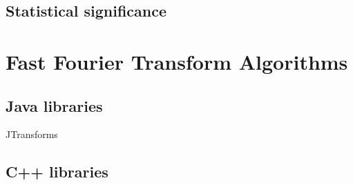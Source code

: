 \subsection{Statistical significance}

\section{Fast Fourier Transform Algorithms}

\subsection{Java libraries}
JTransforms\cite{jtransforms:benchmark}

\subsection{C++ libraries}
\cite{FFTW05}

